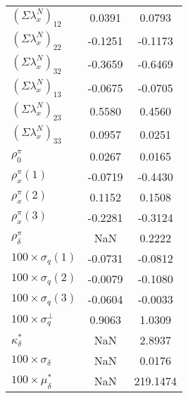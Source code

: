 \documentclass{article}
\begin{document}
\begin{center}
\begin{tabular}{l|l|l}
$\left( \Sigma \lambda _{x}^{N}\right) _{12}$ & \multicolumn{1}{|c|}{0.0391}
& \multicolumn{1}{|c}{0.0793} \\ 
$\left( \Sigma \lambda _{x}^{N}\right) _{22}$ & \multicolumn{1}{|c|}{-0.1251}
& \multicolumn{1}{|c}{-0.1173} \\ 
$\left( \Sigma \lambda _{x}^{N}\right) _{32}$ & \multicolumn{1}{|c|}{-0.3659}
& \multicolumn{1}{|c}{-0.6469} \\ 
$\left( \Sigma \lambda _{x}^{N}\right) _{13}$ & \multicolumn{1}{|c|}{-0.0675}
& \multicolumn{1}{|c}{-0.0705} \\ 
$\left( \Sigma \lambda _{x}^{N}\right) _{23}$ & \multicolumn{1}{|c|}{0.5580}
& \multicolumn{1}{|c}{0.4560} \\ 
$\left( \Sigma \lambda _{x}^{N}\right) _{33}$ & \multicolumn{1}{|c|}{0.0957}
& \multicolumn{1}{|c}{0.0251} \\ 
$\rho _{0}^{\pi }$ & \multicolumn{1}{|c|}{0.0267} & \multicolumn{1}{|c}{
0.0165} \\ 
$\rho _{x}^{\pi }\left( 1\right) $ & \multicolumn{1}{|c|}{-0.0719} & 
\multicolumn{1}{|c}{-0.4430} \\ 
$\rho _{x}^{\pi }\left( 2\right) $ & \multicolumn{1}{|c|}{0.1152} & 
\multicolumn{1}{|c}{0.1508} \\ 
$\rho _{x}^{\pi }\left( 3\right) $ & \multicolumn{1}{|c|}{-0.2281} & 
\multicolumn{1}{|c}{-0.3124} \\ 
$\rho _{\delta }^{\pi }$ & \multicolumn{1}{|c|}{NaN} & \multicolumn{1}{|c}{
0.2222} \\ 
$100\times \sigma _{q}\left( 1\right) $ & \multicolumn{1}{|c|}{-0.0731} & 
\multicolumn{1}{|c}{-0.0812} \\ 
$100\times \sigma _{q}\left( 2\right) $ & \multicolumn{1}{|c|}{-0.0079} & 
\multicolumn{1}{|c}{-0.1080} \\ 
$100\times \sigma _{q}\left( 3\right) $ & \multicolumn{1}{|c|}{-0.0604} & 
\multicolumn{1}{|c}{-0.0033} \\ 
$100\times \sigma _{q}^{\perp }$ & \multicolumn{1}{|c|}{0.9063} & 
\multicolumn{1}{|c}{1.0309} \\ 
$\kappa _{\delta }^{\ast }$ & \multicolumn{1}{|c|}{NaN} & 
\multicolumn{1}{|c}{2.8937} \\ 
$100\times \sigma _{\delta }$ & \multicolumn{1}{|c|}{NaN} & 
\multicolumn{1}{|c}{0.0176} \\ 
$100\times \mu _{\delta }^{\ast }$ & \multicolumn{1}{|c|}{NaN} & 
\multicolumn{1}{|c}{219.1474} \\ \hline
\end{tabular}%
\pagebreak 
\end{center}
\end{document}
